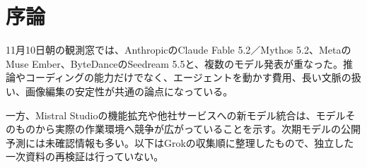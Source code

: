 \section{序論}
11月10日朝の観測窓では、AnthropicのClaude Fable 5.2／Mythos 5.2、MetaのMuse Ember、ByteDanceのSeedream 5.5と、複数のモデル発表が重なった。推論やコーディングの能力だけでなく、エージェントを動かす費用、長い文脈の扱い、画像編集の安定性が共通の論点になっている。

一方、Mistral Studioの機能拡充や他社サービスへの新モデル統合は、モデルそのものから実際の作業環境へ競争が広がっていることを示す。次期モデルの公開予測には未確認情報も多い。以下はGrokの収集順に整理したもので、独立した一次資料の再検証は行っていない。